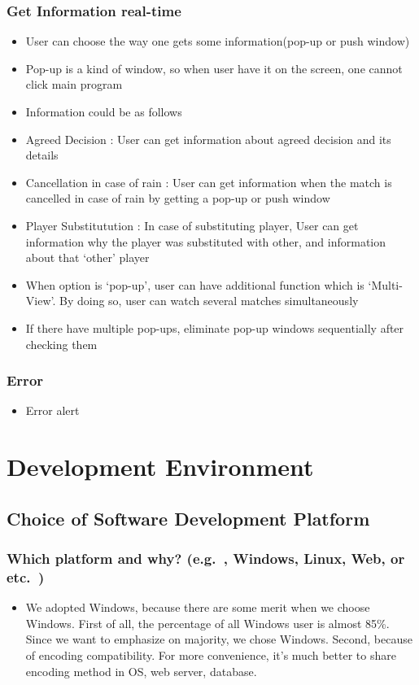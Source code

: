 \documentclass[conference,compsoc, twocolumn]{IEEEtran}
\begin{document}
\subsubsection{Get Information real-time}
\begin{itemize}
\item User can choose the way one gets some information(pop-up or push window)
\item Pop-up is a kind of window, so when user have it on the screen, one cannot click main program
\item Information could be as follows
\item Agreed Decision : User can get information about agreed decision and its details
\item Cancellation in case of rain : User can get information when the match is cancelled in case of rain by getting a pop-up or push window
\item Player Substitutution : In case of substituting player, User can get information why the player was substituted with other, and information about that ‘other’ player
\item When option is ‘pop-up’, user can have additional function which is ‘Multi-View’.  By doing so, user can watch several matches simultaneously
\item If there have multiple pop-ups, eliminate pop-up windows sequentially after checking them
\end{itemize}

\subsubsection{Error}
\begin{itemize}
\item Error alert
\end{itemize}



\section{Development Environment}



\subsection{Choice of Software Development Platform}


\subsubsection{Which platform and why? (e.g.\ , Windows, Linux, Web, or etc.\ )}
\begin{itemize}
\item We adopted Windows, because there are some merit when we choose Windows. First of all, the percentage of all Windows user is almost 85\%. Since we want to emphasize on majority, we chose Windows. Second, because of encoding compatibility. For more convenience, it’s much better to share encoding method in OS, web server, database.
\end{itemize}
\end{document}
